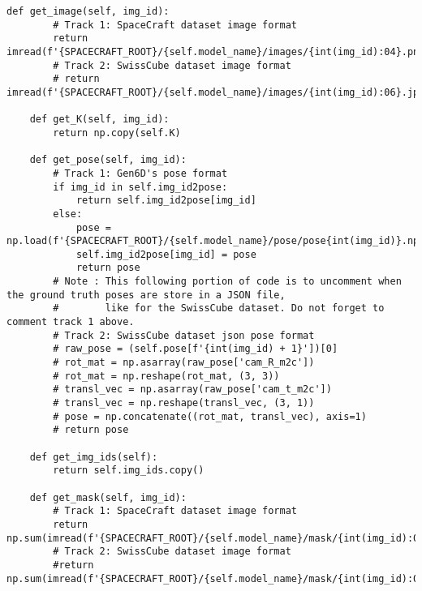 \begin{lstlisting}[style=pythonstyle, label=lst:1, caption=Python code of the data loading class \texttt{SpaceCraftCVLabDatabase()} from file \texttt{database.py}.]
    def get_image(self, img_id):
        # Track 1: SpaceCraft dataset image format
        return imread(f'{SPACECRAFT_ROOT}/{self.model_name}/images/{int(img_id):04}.png')
        # Track 2: SwissCube dataset image format
        # return imread(f'{SPACECRAFT_ROOT}/{self.model_name}/images/{int(img_id):06}.jpg')

    def get_K(self, img_id):
        return np.copy(self.K)

    def get_pose(self, img_id):
        # Track 1: Gen6D's pose format
        if img_id in self.img_id2pose:
            return self.img_id2pose[img_id]
        else:
            pose = np.load(f'{SPACECRAFT_ROOT}/{self.model_name}/pose/pose{int(img_id)}.npy')
            self.img_id2pose[img_id] = pose
            return pose
        # Note : This following portion of code is to uncomment when the ground truth poses are store in a JSON file,
        #        like for the SwissCube dataset. Do not forget to comment track 1 above.
        # Track 2: SwissCube dataset json pose format
        # raw_pose = (self.pose[f'{int(img_id) + 1}'])[0]
        # rot_mat = np.asarray(raw_pose['cam_R_m2c'])
        # rot_mat = np.reshape(rot_mat, (3, 3))
        # transl_vec = np.asarray(raw_pose['cam_t_m2c'])
        # transl_vec = np.reshape(transl_vec, (3, 1))
        # pose = np.concatenate((rot_mat, transl_vec), axis=1)
        # return pose

    def get_img_ids(self):
        return self.img_ids.copy()

    def get_mask(self, img_id):
        # Track 1: SpaceCraft dataset image format
        return np.sum(imread(f'{SPACECRAFT_ROOT}/{self.model_name}/mask/{int(img_id):04}.png'),-1)>0
        # Track 2: SwissCube dataset image format
        #return np.sum(imread(f'{SPACECRAFT_ROOT}/{self.model_name}/mask/{int(img_id):06}.png'),-1)>0
\end{lstlisting}

\cleardoublepage{}

